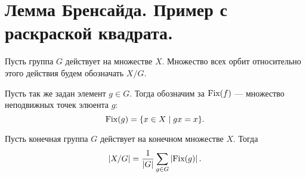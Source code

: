 % 
% 
\section{Лемма Бренсайда. Пример с раскраской квадрата.}
\begin{defn}
    Пусть группа $ G$ действует на множестве  $ X$.  {\sf Множество всех орбит относительно этого действия} будем обозначать $ X / G$.  
\end{defn}
\begin{defn}
    Пусть так же задан элемент $ g \in G$. Тогда обозначим за $ {\mathop{\text{\rm Fix}}}(f)$ ---  {\sf множество неподвижных точек элюента $ g$}:
     \[
	 {\mathop{\text{\rm Fix}}}(g) = \{x \in X \mid gx = x\}
    .\] 
\end{defn}
\begin{thm}[Бренсайд]
    Пусть конечная группа $ G$ действует на конечном множестве  $ X$. Тогда 
     \[
	 \left| X / G \right|  = \frac{1}{\left| G \right| } \sum_{g \in G}^{} \left| {\mathop{\text{\rm Fix}}}(g) \right| 
    .\] 
\end{thm}
% 

